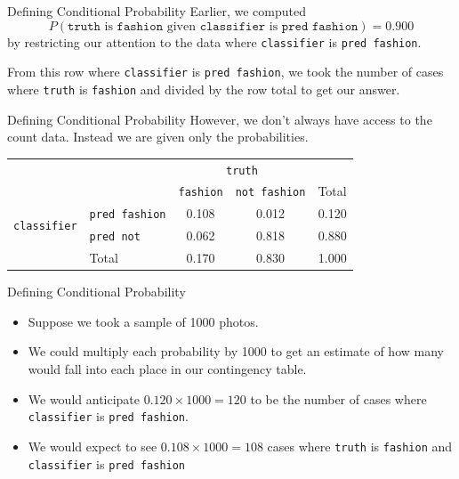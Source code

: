 \begin{frame}{Defining Conditional Probability}
    Earlier, we computed 
    \[
    P(\texttt{truth} \text{ is } \texttt{fashion} \text{ given } \texttt{classifier} \text{ is } \texttt{pred fashion}) = 0.900
    \]
    by restricting our attention to the data where \texttt{classifier} is \texttt{pred fashion}. 
    
    \vspace{12pt}From this row where \texttt{classifier} is \texttt{pred fashion}, we took the number of cases where \texttt{truth} is \texttt{fashion} and divided by the row total to get our answer. 
\end{frame}

\begin{frame}{Defining Conditional Probability}
    However, we don't always have access to the count data. Instead we are given only the probabilities. 
    \begin{center}
        \begin{tabular}{r l cc r}
		& & \multicolumn{2}{c}{{\texttt{truth}}} & \\
        \cline{3-4}
		& & \texttt{fashion} & \texttt{not fashion} & Total  \\ 
        \cline{2-5}
        \multirow{2}{*}{{\texttt{classifier}}} 
        & \texttt{pred fashion}   & 0.108 & 0.012 & 0.120 \\ 
  		& \texttt{pred not}       & 0.062 & 0.818 & 0.880 \\ 
        \cline{2-5}
  		& Total	& 0.170 & 0.830 & 1.000 \\
        \cline{2-5}
    \end{tabular}
    \end{center}
\end{frame}

\begin{frame}{Defining Conditional Probability}    
    \begin{itemize}
        \item Suppose we took a sample of 1000 photos. 
        \item We could multiply each probability by 1000 to get an estimate of how many would fall into each place in our contingency table.
        \item We would anticipate $0.120\times1000=120$ to be the number of cases where \texttt{classifier} is \texttt{pred fashion}.
        \item We would expect to see $0.108\times1000=108$ cases where \texttt{truth} is \texttt{fashion} and \texttt{classifier} is \texttt{pred fashion}
    \end{itemize}
\end{frame}

